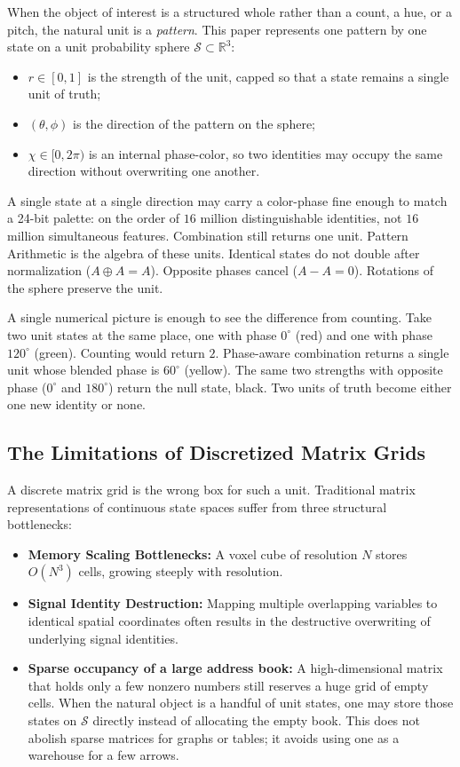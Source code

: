 \documentclass[12pt, a4paper]{article}
\begin{document}
When the object of interest is a structured whole rather than a
count, a hue, or a pitch, the natural unit is a \emph{pattern}.
This paper represents one pattern by one state on a unit
probability sphere $\mathcal{S} \subset \mathbb{R}^3$:
\begin{itemize}
    \item $r \in [0, 1]$ is the strength of the unit, capped so that a state remains a single unit of truth;
    \item $(\theta, \phi)$ is the direction of the pattern on the sphere;
    \item $\chi \in [0, 2\pi)$ is an internal phase-color, so two identities may occupy the same direction without overwriting one another.
\end{itemize}
A single state at a single direction may carry a color-phase fine enough
to match a 24-bit palette: on the order of $16$ million distinguishable
identities, not $16$ million simultaneous features. Combination still
returns one unit.
Pattern Arithmetic is the algebra of these units. Identical states do not double after normalization ($A \oplus A = A$). Opposite phases cancel ($A - A = 0$). Rotations of the sphere preserve the unit.

A single numerical picture is enough to see the difference from counting. Take two unit states at the same place, one with phase $0^\circ$ (red) and one with phase $120^\circ$ (green). Counting would return $2$. Phase-aware combination returns a single unit whose blended phase is $60^\circ$ (yellow). The same two strengths with opposite phase ($0^\circ$ and $180^\circ$) return the null state, black. Two units of truth become either one new identity or none.

\subsection{The Limitations of Discretized Matrix Grids}
A discrete matrix grid is the wrong box for such a unit. Traditional matrix representations of continuous state spaces suffer from three structural bottlenecks:
\begin{itemize}
    \item \textbf{Memory Scaling Bottlenecks:} A voxel cube of resolution $N$ stores $O(N^3)$ cells, growing steeply with resolution.
    \item \textbf{Signal Identity Destruction:} Mapping multiple overlapping variables to identical spatial coordinates often results in the destructive overwriting of underlying signal identities.
    \item \textbf{Sparse occupancy of a large address book:} A high-dimensional matrix that holds only a few nonzero numbers still reserves a huge grid of empty cells. When the natural object is a handful of unit states, one may store those states on $\mathcal{S}$ directly instead of allocating the empty book. This does not abolish sparse matrices for graphs or tables; it avoids using one as a warehouse for a few arrows.
\end{itemize}
\end{document}
